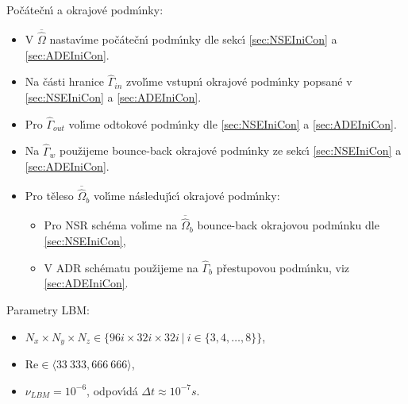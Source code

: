 \begin{tcolorbox}[colframe=blue, title = \'{U}loha \ref{sub:Prob02}]
            Po\v{c}\'{a}te\v{c}n\'{\i} a okrajov\'{e} podm\'{\i}nky:
            \begin{itemize}
                \item V $\overline{\hat{\Omega}}$ nastav\'{\i}me po\v{c}\'{a}te\v{c}n\'{\i} podm\'{\i}nky dle sekc\'{\i} \ref{sec:NSEIniCon} a \ref{sec:ADEIniCon}.
                \item Na \v{c}\'{a}sti hranice $\hat{\Gamma}_{in}$ zvol\'{\i}me vstupn\'{\i} okrajov\'{e} podm\'{\i}nky popsan\'{e} v \ref{sec:NSEIniCon} a \ref{sec:ADEIniCon}.
                \item Pro $\hat{\Gamma}_{out}$ vol\'{\i}me odtokov\'{e} podm\'{\i}nky dle \ref{sec:NSEIniCon} a \ref{sec:ADEIniCon}.
                \item Na $\hat{\Gamma}_{w}$ pou\v{z}ijeme bounce-back okrajov\'{e} podm\'{\i}nky ze sekc\'{\i} \ref{sec:NSEIniCon} a \ref{sec:ADEIniCon}.
                \item Pro t\v{e}leso $\overline{\hat{\Omega}}_b$ vol\'{\i}me n\'{a}sleduj\'{\i}c\'{\i} okrajov\'{e} podm\'{\i}nky: \begin{itemize}
                    \item Pro NSR sch\'{e}ma vol\'{\i}me na $\overline{\hat{\Omega}}_b$ bounce-back okrajovou podm\'{\i}nku dle \ref{sec:NSEIniCon},
                    \item V ADR sch\'{e}matu pou\v{z}ijeme na $\hat{\Gamma}_b$ p\v{r}estupovou podm\'{\i}nku, viz \ref{sec:ADEIniCon}.  
                \end{itemize}
            \end{itemize}
            
            Parametry LBM:
            \begin{itemize}
                \item $N_x \times N_y \times N_z \in \{ 96i \times 32i \times 32i\ | \ i \in \{ 3,4,\dots,8 \} \} $,
                \item $\mathrm{Re} \in \langle 33 \ 333, 666 \ 666 \rangle$,
                \item $\nu_{LBM} = 10^{-6}$, odpov\'{\i}d\'{a} $\Delta t \approx 10^{-7} s$.
            \end{itemize}

        \end{tcolorbox}
        
